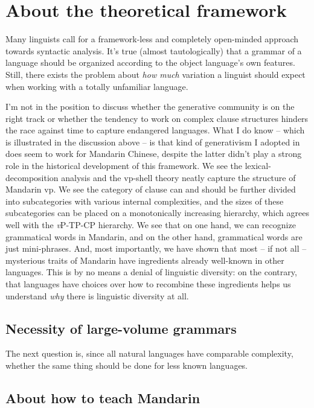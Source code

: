 \documentclass[UTF8, a4paper, oneside, scheme=plain, 12pt]{ctexrep}
\newcommand{\vP}{\textit{v}P}
\begin{document}
\section{About the theoretical framework}

Many linguists call for a framework-less and completely open-minded approach towards syntactic analysis.
It's true (almost tautologically) that a grammar of a language 
should be organized according to the object language's 
own features.
Still, there exists the problem about \emph{how much} variation 
a linguist should expect when working with a totally unfamiliar language.

I'm not in the position to discuss whether the generative community 
is on the right track 
or whether the tendency to work on complex clause structures 
hinders the race against time to capture 
endangered languages.
What I do know -- which is illustrated in the discussion above -- 
is that kind of generativism I adopted in 
does seem to work for Mandarin Chinese, 
despite the latter didn't play a strong role 
in the historical development of this framework.
We see the lexical-decomposition analysis 
and the \acs{vp}-shell theory 
neatly capture the structure of Mandarin \acs{vp}.
We see the category of clause can and should be 
further divided into subcategories with various internal complexities,
and the sizes of these subcategories can be placed on 
a monotonically increasing hierarchy,
which agrees well with the \vP-TP-CP hierarchy.
We see that on one hand, 
we can recognize grammatical words in Mandarin, 
and on the other hand, 
grammatical words are just mini-phrases.
And, most importantly, we have shown that most -- if not all -- mysterious traits 
of Mandarin have ingredients already well-known in other languages.
This is by no means a denial of linguistic diversity: 
on the contrary, 
that languages have choices over how to recombine these ingredients
helps us understand \emph{why} there is linguistic diversity at all.

\subsection{Necessity of large-volume grammars}

The next question is, 
since all natural languages have comparable complexity, 
whether the same thing should be done for less known languages.

\subsection{About how to teach Mandarin}

\printbibliography[title=References]
\end{document}
